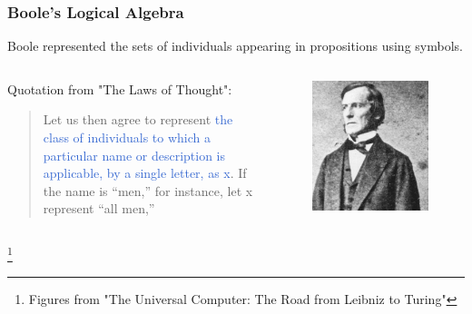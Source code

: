 \documentclass[unicode, 14pt, aspectratio=169]{beamer}
\newcommand\blfootnote[1]{%
  \begingroup
  \renewcommand\thefootnote{}\footnote{#1}%
  \addtocounter{footnote}{-1}%
  \endgroup
}
\begin{document}
\begin{frame}
  \frametitle{Boole's Logical Algebra}
  {\large Boole represented the sets of individuals appearing in propositions using symbols.}
  \begin{columns}
    \begin{column}{0.7\textwidth}
      \begin{center}
        Quotation from "The Laws of Thought"\supercite{bool}:
        \begin{quotation}
          Let us then agree to represent \textcolor{highlight}{the class of individuals to which a particular name or description is applicable, by a single letter, as x}. If the name is “men,” for instance, let x represent “all men,”
        \end{quotation}
      \end{center}
    \end{column}    
    \begin{column}{0.2\textwidth}
      \begin{figure}
        \includegraphics[width=1\textwidth]{images/bool.png}
      \end{figure}       
    \end{column} 
  \end{columns}
  \blfootnote{Figures from "The Universal Computer: The Road from Leibniz to Turing"}
\end{frame}
\end{document}
